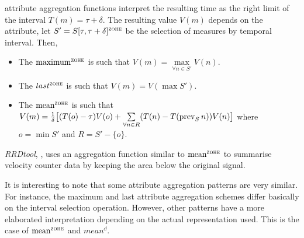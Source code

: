 \zohe{} attribute aggregation functions interpret the resulting time
as the right limit of the interval $T(m)=\tau+\delta$. The resulting
value $V(m)$ depends on the attribute, let
$S'=S[\tau,\tau+\delta]^\zohe{}$ be the selection of measures by
\zohe{} temporal interval. Then,

\begin{itemize}
\item The $\maxz$ is such that $V(m) = \max\limits_{\forall n \in S'}
  V(n)$.
\item The $last^\zohe{}$ is such that $V(m) = V(\max S')$.
\item The $\meanz$ is such that $V(m) = \frac{1}{\delta}
  \big[(T(o)-\tau)V(o) + \sum\limits_{\forall n\in R}( T(n)-
  T(\operatorname*{prev}_S n) )V(n)\big]$ where $o=\min S'$ and $R= S' - \{o\}$.
\end{itemize}

\emph{RRDtool}, \cite{rrdtool}, uses an aggregation function similar
to $\meanz$ to summarise velocity counter data by keeping the area
below the original signal.

It is interesting to note that some attribute aggregation patterns are
very similar. For instance, the maximum and last attribute aggregation
schemes differ basically on the interval selection operation. However,
other patterns have a more elaborated interpretation depending on the
actual representation used. This is the case of $\meanz$ and $mean^\dd$.


